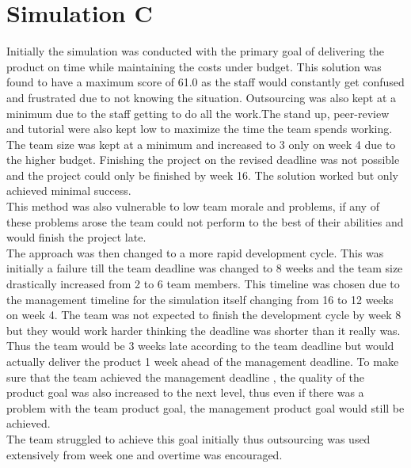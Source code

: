 \documentclass{article}
\begin{document}
\section{Simulation C}
Initially the simulation was conducted with the primary goal of delivering the product on time while maintaining the costs under budget. This solution was found to have a maximum score of 61.0 as the staff would constantly get confused and frustrated due to not knowing the situation. Outsourcing was also kept at a minimum due to the staff getting to do all the work.The stand up, peer-review and tutorial were also kept low to maximize the time the team spends working. The team size was kept at a minimum and increased to 3 only on week 4 due to the higher budget. Finishing the project on the revised deadline was not possible and the project could only be finished by week 16. The solution worked but only achieved minimal success. \\
This method was also vulnerable to low team morale and problems, if any of these problems arose the team could not perform to the best of their abilities and would finish the project late.
\\
The approach was then changed to a more rapid development cycle. This was initially a failure till the team deadline was changed to 8 weeks and the team size drastically increased from 2 to 6 team members. This timeline was chosen due to the management timeline for the simulation itself changing from 16 to 12 weeks on week 4. The team was not expected to finish the development cycle by week 8 but they would work harder thinking the deadline was shorter than it really was. Thus the team would be 3 weeks late according to the team deadline but would actually deliver the product 1 week ahead of the management deadline. To make sure that the team achieved the management deadline , the quality of the product goal was also increased to the next level, thus even if there was a problem with the team product goal, the management product goal would still be achieved.\\
The team struggled to achieve this goal initially thus outsourcing was used extensively from week one and overtime was encouraged. \\
\end{document}
